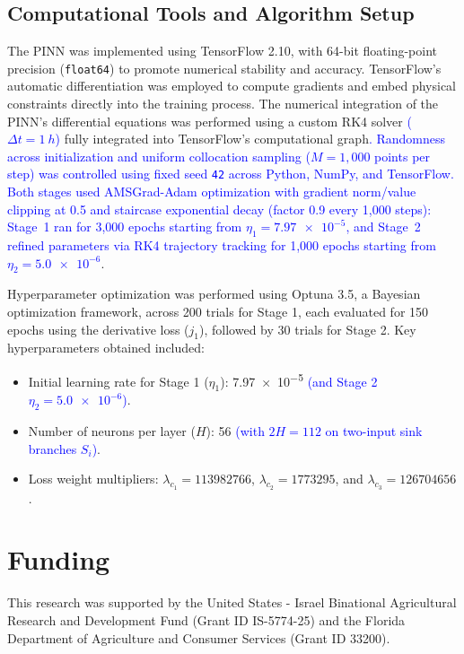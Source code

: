 \documentclass[pdflatex,sn-nature]{sn-jnl}%
\theoremstyle{thmstyleone}%
\theoremstyle{thmstyletwo}%
\theoremstyle{thmstylethree}%
\begin{document}
\subsection{Computational Tools and Algorithm Setup}
The PINN was implemented using TensorFlow 2.10, with 64-bit floating-point precision (\texttt{float64}) to promote numerical stability and accuracy. TensorFlow’s automatic differentiation was employed to compute gradients and embed physical constraints directly into the training process.
The numerical integration of the PINN’s differential equations was performed using a custom RK4 solver \textcolor{blue}{(\(\Delta t = \SI{1}{h}\))} fully integrated into TensorFlow’s computational graph\textcolor{blue}{. Randomness across initialization and uniform collocation sampling (\(M = 1{,}000\) points per step) was controlled using fixed seed \texttt{42} across Python, NumPy, and TensorFlow. Both stages used AMSGrad-Adam optimization with gradient norm/value clipping at 0.5 and staircase exponential decay (factor 0.9 every 1,000 steps): Stage~1 ran for 3,000 epochs starting from \(\eta_1 = \num{7.97e-5}\), and Stage~2 refined parameters via RK4 trajectory tracking for 1,000 epochs starting from \(\eta_2 = \num{5.0e-6}\)}.

Hyperparameter optimization was performed using Optuna 3.5, a Bayesian optimization framework, across 200 trials for Stage 1, each evaluated for 150 epochs using the derivative loss ($j_1$), followed by 30 trials for Stage 2. Key hyperparameters obtained included:
\begin{itemize}
\item Initial learning rate for Stage 1 ($\eta_1$): \num{7.97e-5} \textcolor{blue}{(and Stage 2 $\eta_2 = \num{5.0e-6}$)}.
\item Number of neurons per layer ($H$): 56 \textcolor{blue}{(with $2H = 112$ on two-input sink branches $S_i$)}.
\item Loss weight multipliers: $\lambda_{c_1} = \num{113982766}$, $\lambda_{c_2} = \num{1773295}$, and $\lambda_{c_3} = \num{126704656}$.
\end{itemize}

\FloatBarrier

\section*{Funding}
This research was supported by the United States - Israel Binational Agricultural Research and Development Fund (Grant ID IS-5774-25) and the Florida Department of Agriculture and Consumer Services (Grant ID 33200).
\end{document}
